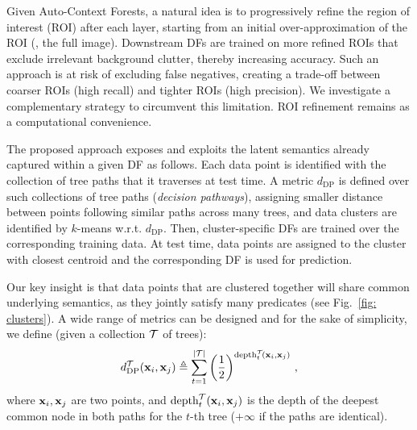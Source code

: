 Given Auto-Context Forests, a natural idea is to progressively refine the region of interest (ROI) after each layer, starting from an initial over-approximation of the ROI (\eg, the full image). Downstream DFs are trained on 
more refined ROIs that exclude irrelevant background clutter, thereby increasing accuracy. 
Such an approach is at risk of excluding false negatives, creating a trade-off between coarser ROIs (high recall) and tighter ROIs (high precision). We investigate a complementary strategy to circumvent this limitation. ROI refinement remains as a computational convenience.

The proposed approach exposes and exploits the latent semantics already captured within a given DF as follows. Each data point is identified with the collection of tree paths that it traverses at test time. A metric $d_{\text{DP}}$ is defined over such collections of tree paths (\textit{decision pathways}), assigning smaller distance between points following similar paths across many trees, and data clusters are identified by $k$-means w.r.t. $d_{\text{DP}}$. %
Then, cluster-specific DFs are trained over the corresponding training data. At test time, data points are assigned to the cluster with closest centroid and the corresponding DF is used for prediction.

Our key insight is that data points that are clustered together will share common underlying semantics, as they jointly satisfy many predicates (see Fig.~\ref{fig: clusters}). A wide range of metrics can be designed and for the sake of simplicity, we define (given a collection $\mathcal{T}$ of trees):
\begin{equation}
d_{\text{DP}}^{\mathcal{T}}(\boldsymbol{\mathrm{x}}_i, \boldsymbol{\mathrm{x}}_j)\triangleq \sum_{t=1}^{\vert\mathcal{T}\vert} \left(\frac{1}{2}\right)^{\text{depth}_t^{\mathcal{T}}\!(\boldsymbol{\mathrm{x}}_i,\boldsymbol{\mathrm{x}}_j)}\, ,
\end{equation}
where $\boldsymbol{\mathrm{x}}_i, \boldsymbol{\mathrm{x}}_j$ are two points, and $\text{depth}_t^{\mathcal{T}}(\boldsymbol{\mathrm{x}}_i,\boldsymbol{\mathrm{x}}_j)$ is the depth of the deepest common node in both paths for the $t$-th tree ($+\infty$ if the paths are identical).

